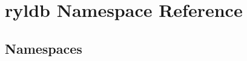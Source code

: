 \hypertarget{namespaceryldb}{}\section{ryldb Namespace Reference}
\label{namespaceryldb}
\subsection*{Namespaces}
\begin{DoxyCompactItemize}
\end{DoxyCompactItemize}
